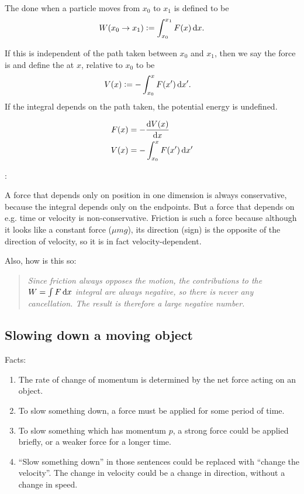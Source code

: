 The  done when a particle moves from $x_0$ to $x_1$ is defined to be
\begin{align*}
  W(x_0 \to x_1) := \int_{x_0}^{x_1} F(x) \dx.
\end{align*}

If this is independent of the path taken between $x_0$ and $x_1$, then we say the force is
 and define the  at $x$, relative to $x_0$ to be
\begin{align*}
  V(x) &:= -\int_{x_0}^x F(x') \dx'.
\end{align*}
If the integral depends on the path taken, the potential energy is undefined.


\begin{align*}
  F(x) &= -\frac{\d V(x)}{\dx} \\
  V(x) &= -\int_{x_0}^x F(x') \dx'
\end{align*}

:

A force that depends only on position in one dimension is always conservative, because the integral
depends only on the endpoints. But a force that depends on e.g. time or velocity is
non-conservative. Friction is such a force because although it looks like a constant force
($\mu mg$), its direction (sign) is the opposite of the direction of velocity, so it is in fact
velocity-dependent.

Also, how is this so:
\begin{quote}
  \emph{Since friction always opposes the motion, the contributions to the $W = \int F \dx$ integral are
    always negative, so there is never any cancellation. The result is therefore a large negative
    number.}
\end{quote}

\subsection{Slowing down a moving object}

Facts:

\begin{enumerate}
\item The rate of change of momentum is determined by the net force acting on an object.
\item To slow something down, a force must be applied for some period of time.
\item To slow something which has momentum $p$, a strong force could be applied briefly, or a weaker
  force for a longer time.
\item ``Slow something down'' in those sentences could be replaced with ``change the velocity''. The
  change in velocity could be a change in direction, without a change in speed.
\end{enumerate}


